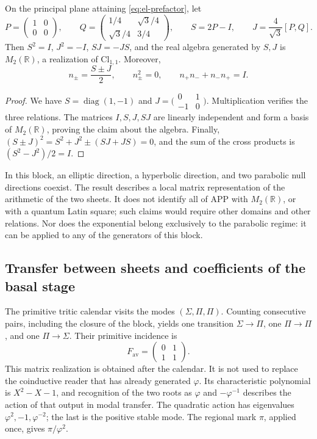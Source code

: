 \begin{proposition}
On the principal plane attaining \eqref{eq:el-prefactor}, let
\[
 P=\begin{pmatrix}1&0\\0&0\end{pmatrix},\qquad
 Q=\begin{pmatrix}1/4&\sqrt3/4\\\sqrt3/4&3/4\end{pmatrix},\qquad
 S=2P-I,\qquad J=\frac4{\sqrt3}[P,Q].
\]
Then \(S^2=I\), \(J^2=-I\), \(SJ=-JS\), and the real algebra
generated by \(S,J\) is \(M_2(\mathbb R)\), a realization of
\(\mathrm{Cl}_{1,1}\). Moreover,
\[
 n_\pm=\frac{S\pm J}{2},\qquad
 n_\pm^2=0,\qquad n_+n_-+n_-n_+=I.
\]
\end{proposition}
\begin{proof}
We have \(S=\operatorname{diag}(1,-1)\) and
\(J=\bigl(\begin{smallmatrix}0&1\\-1&0\end{smallmatrix}\bigr)\).
Multiplication verifies the three relations. The matrices
\(I,S,J,SJ\) are linearly independent and form a basis of
\(M_2(\mathbb R)\), proving the claim about the algebra.
Finally, \((S\pm J)^2=S^2+J^2\pm(SJ+JS)=0\), and the sum of the
cross products is \((S^2-J^2)/2=I\).
\end{proof}

In this block, an elliptic direction, a hyperbolic direction, and two
parabolic null directions coexist. The result describes a local
matrix representation of the arithmetic of the two sheets. It does not identify all of APP
with \(M_2(\mathbb R)\), or with a quantum Latin square; such
claims would require other domains and other relations. Nor does the
exponential belong exclusively to the parabolic regime: it can
be applied to any of the generators of this block.

\subsection{Transfer between sheets and coefficients of the basal stage}

The primitive tritic calendar visits the modes
\((\Sigma,\Pi,\Pi)\). Counting consecutive pairs, including the
closure of the block, yields one transition \(\Sigma\to\Pi\), one
\(\Pi\to\Pi\), and one \(\Pi\to\Sigma\). Their primitive incidence is
\[
 F_{\mathrm{av}}=\begin{pmatrix}0&1\\1&1\end{pmatrix}.
\]
This matrix realization is obtained after the calendar. It is not
used to replace the coinductive reader that has already generated \(\varphi\).
Its characteristic polynomial is \(X^2-X-1\), and recognition of the
two roots as \(\varphi\) and \(-\varphi^{-1}\) describes the action of
that output in modal transfer. The quadratic action has eigenvalues
\(\varphi^2,-1,\varphi^{-2}\); the last is the positive stable mode.
The regional mark \(\pi\), applied once, gives
\(\pi/\varphi^2\).

